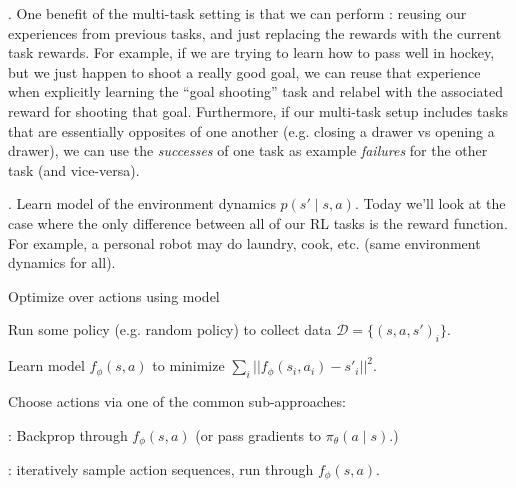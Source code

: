 \documentclass[11pt]{article}
\begin{document}
. One benefit of the multi-task setting is that we can perform : reusing our experiences from previous tasks, and just replacing the rewards with the current task rewards. For example, if we are trying to learn how to pass well in hockey, but we just happen to shoot a really good goal, we can reuse that experience when explicitly learning the ``goal shooting'' task and relabel with the associated reward for shooting that goal. Furthermore, if our multi-task setup includes tasks that are essentially opposites of one another (e.g. closing a drawer vs opening a drawer), we can use the \textit{successes} of one task as example \textit{failures} for the other task (and vice-versa). 













. Learn model of the environment dynamics $p(s' \mid s, a)$. Today we'll look at the case where the only difference between all of our RL tasks is the reward function. For example, a personal robot may do laundry, cook, etc. (same environment dynamics for all). 

\begin{algorithm}
	Optimize over actions using model
	\begin{compactenum}
		\item Run some policy (e.g. random policy) to collect data $\mathcal D = \{ (s, a, s')_i \}$. 
		
		\item Learn model $f_{\phi}(s, a)$ to minimize $\sum_i || f_{\phi}(s_i, a_i) - s'_i ||^2$. 
		
		\item Choose actions via one of the common sub-approaches:
		\begin{compactitem}
			\item {}: Backprop through $f_{\phi}(s, a)$ (or pass gradients to $\pi_{\theta}(a \mid s)$.)
			\item {}: iteratively sample action sequences, run through $f_{\phi}(s, a)$.
		\end{compactitem}
	
	\end{compactenum}
\end{algorithm}
\end{document}
